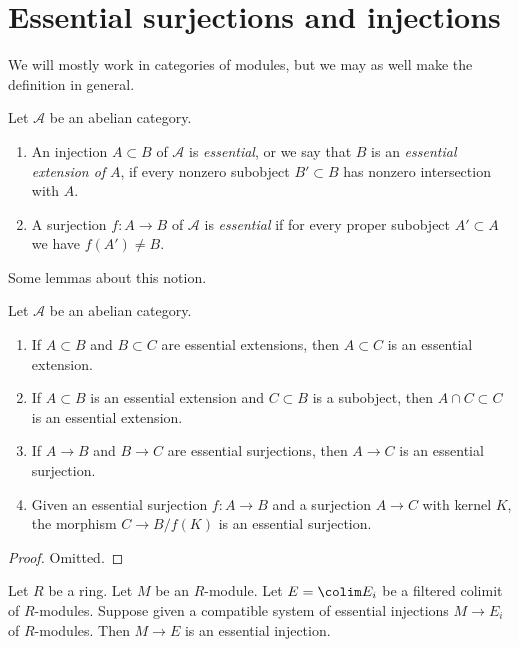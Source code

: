 \section{Essential surjections and injections}
\label{section-essential}

\noindent
We will mostly work in categories of modules, but we may as well make
the definition in general.

\begin{definition}
\label{definition-essential}
Let $\mathcal{A}$ be an abelian category.
\begin{enumerate}
\item An injection $A \subset B$ of $\mathcal{A}$ is {\it essential},
or we say that $B$ is an {\it essential extension of} $A$,
if every nonzero subobject $B' \subset B$ has nonzero intersection with $A$.
\item A surjection $f : A \to B$ of $\mathcal{A}$ is {\it essential}
if for every proper subobject $A' \subset A$ we have $f(A') \not = B$.
\end{enumerate}
\end{definition}

\noindent
Some lemmas about this notion.

\begin{lemma}
\label{lemma-essential}
Let $\mathcal{A}$ be an abelian category.
\begin{enumerate}
\item If $A \subset B$ and $B \subset C$ are essential extensions, then
$A \subset C$ is an essential extension.
\item If $A \subset B$ is an essential extension and $C \subset B$
is a subobject, then $A \cap C \subset C$ is an essential extension.
\item If $A \to B$ and $B \to C$ are essential surjections, then
$A \to C$ is an essential surjection.
\item Given an essential surjection $f : A \to B$ and a surjection
$A \to C$ with kernel $K$, the morphism $C \to B/f(K)$ is an essential
surjection.
\end{enumerate}
\end{lemma}

\begin{proof}
Omitted.
\end{proof}

\begin{lemma}
\label{lemma-union-essential-extensions}
Let $R$ be a ring. Let $M$ be an $R$-module. Let $E = \colim E_i$
be a filtered colimit of $R$-modules. Suppose given a compatible
system of essential injections $M \to E_i$ of $R$-modules.
Then $M \to E$ is an essential injection.
\end{lemma}

